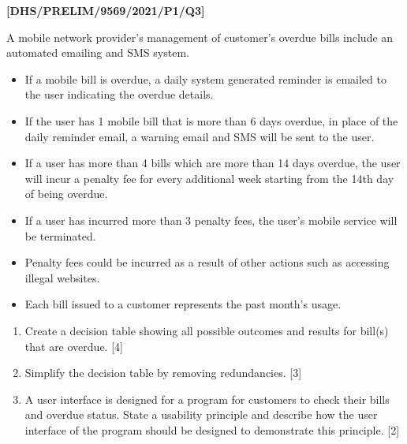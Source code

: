 \item \textbf{{[}DHS/PRELIM/9569/2021/P1/Q3{]} }

A mobile network provider\textquoteright s management of customer\textquoteright s
overdue bills include an automated emailing and SMS system. 
\begin{itemize}
\item If a mobile bill is overdue, a daily system generated reminder is
emailed to the user indicating the overdue details. 
\item If the user has 1 mobile bill that is more than 6 days overdue, in
place of the daily reminder email, a warning email and SMS will be
sent to the user. 
\item If a user has more than 4 bills which are more than 14 days overdue,
the user will incur a penalty fee for every additional week starting
from the 14th day of being overdue.
\item If a user has incurred more than 3 penalty fees, the user\textquoteright s
mobile service will be terminated. 
\item Penalty fees could be incurred as a result of other actions such as
accessing illegal websites. 
\item Each bill issued to a customer represents the past month\textquoteright s
usage. 
\end{itemize}
\begin{enumerate}
\item Create a decision table showing all possible outcomes and results
for bill(s) that are overdue. \hfill{}{[}4{]}
\item Simplify the decision table by removing redundancies. \hfill{}{[}3{]}
\item A user interface is designed for a program for customers to check
their bills and overdue status. State a usability principle and describe
how the user interface of the program should be designed to demonstrate
this principle.\hfill{} {[}2{]}
\end{enumerate}